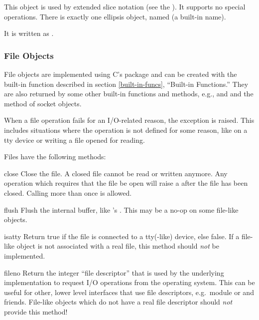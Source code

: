 This object is used by extended slice notation (see the
).  It supports no
special operations.  There is exactly one ellipsis object, named
 (a built-in name).

It is written as .


\subsubsection{File Objects
               \label{bltin-file-objects}}

File objects are implemented using C's  package and can be
created with the built-in function
 described in section 
\ref{built-in-funcs}, ``Built-in Functions.''  They are also returned
by some other built-in functions and methods, e.g.,
 and  and the
 method of socket objects.

When a file operation fails for an I/O-related reason, the exception
 is raised.  This includes situations where the
operation is not defined for some reason, like  on a tty
device or writing a file opened for reading.

Files have the following methods:


\begin{methoddesc}[file]{close}{}
  Close the file.  A closed file cannot be read or written anymore.
  Any operation which requires that the file be open will raise a
   after the file has been closed.  Calling
   more than once is allowed.
\end{methoddesc}

\begin{methoddesc}[file]{flush}{}
  Flush the internal buffer, like 's
  .  This may be a no-op on some file-like
  objects.
\end{methoddesc}

\begin{methoddesc}[file]{isatty}{}
  Return true if the file is connected to a tty(-like) device, else
  false.   If a file-like object is not associated
  with a real file, this method should \emph{not} be implemented.
\end{methoddesc}

\begin{methoddesc}[file]{fileno}{}
  Return the integer ``file descriptor'' that is used by the
  underlying implementation to request I/O operations from the
  operating system.  This can be useful for other, lower level
  interfaces that use file descriptors, e.g.\ module
   or  and
  friends.   File-like objects which do not have a real
  file descriptor should \emph{not} provide this method!
\end{methoddesc}

